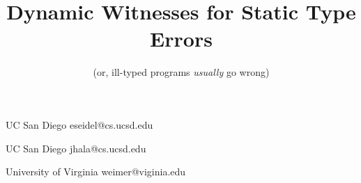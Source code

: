 \documentclass[blind,preprint,nocopyrightspace,10pt,squareay,clearpagebib,explicitsize]{sigplanconf-pldi15}
\theoremstyle{plain}%
\theoremstyle{definition}
\begin{document}
%
%



\title{Dynamic Witnesses for Static Type Errors}

\subtitle{(or, ill-typed programs \emph{usually} go wrong)}

           {UC San Diego}
           {eseidel@cs.ucsd.edu}

           {UC San Diego}
           {jhala@cs.ucsd.edu}

           {University of Virginia}
           {weimer@viginia.edu}

\maketitle








% 

{


}
\end{document}
